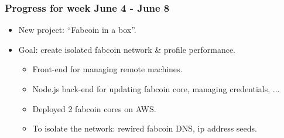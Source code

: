 \begin{frame}
\frametitle{Progress for week June 4 - June 8}
\begin{itemize}
\item New project: ``Fabcoin in a box''.
\item Goal: create isolated fabcoin network \& profile performance.
\begin{itemize}
\item Front-end for managing remote machines.
\item Node.js back-end for updating fabcoin core, managing credentials, ...
\item Deployed 2 fabcoin cores on AWS.
\item To isolate the network: rewired fabcoin DNS, ip address seeds.
\end{itemize}
\end{itemize}
\end{frame}